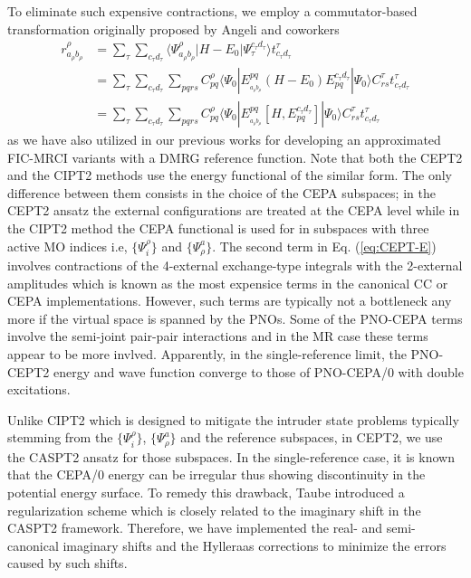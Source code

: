 \documentclass[aip,jcp,amsmath,twocolumn,floatfix,reprint,fleqn]{revtex4-1}
\begin{document}
%
To eliminate such expensive contractions, we employ a commutator-based transformation originally proposed by Angeli and coworkers\cite{angeliintroduction2001,angelin-electron2002,angelinew2006}
%
\begin{align}
  r_{a_\rho b_\rho}^{\rho} &= \sum_{\tau}\sum_{c_\tau d_\tau}\langle\Psi_{a_\rho b_\rho}^{\rho}|H-E_0|\Psi_{\tau}^{c_\tau d_\tau}\rangle t_{c_\tau d_\tau}^\tau \nonumber \\
  &= \sum_{\tau}\sum_{c_\tau d_\tau} \sum_{pqrs} C_{pq}^\rho \langle\Psi_0|E_{_{a_\rho b_\rho}}^{pq}(H-E_0)E_{pq}^{c_\tau d_\tau}|\Psi_0\rangle C_{rs}^\tau t_{c_\tau d_\tau}^\tau \nonumber \\
  &= \sum_{\tau}\sum_{c_\tau d_\tau} \sum_{pqrs} C_{pq}^\rho \langle\Psi_0|E_{_{a_\rho b_\rho}}^{pq}[H,E_{pq}^{c_\tau d_\tau}]|\Psi_0\rangle C_{rs}^\tau t_{c_\tau d_\tau}^\tau \label{eq:comm}
\end{align}
as we have also utilized in our previous works for developing an approximated FIC-MRCI variants with a DMRG reference function.\cite{saitowmultireference2013,doi:10.1021/acs.jctc.5b00270}
%
Note that both the CEPT2 and the CIPT2\cite{celanithe2004} methods use the energy functional of the similar form.
%
The only difference between them consists in the choice of the CEPA subspaces; in the CEPT2 ansatz the external configurations are treated at the CEPA level while in the CIPT2 method the CEPA functional is used for in subspaces with three active MO indices i.e, $\{\Psi_i^\rho\}$ and $\{\Psi_\rho^a\}$.
%
The second term in Eq. (\ref{eq:CEPT-E}) involves contractions of the 4-external exchange-type integrals with the 2-external amplitudes which is known as the most expensice terms in the canonical CC or CEPA implementations.
%
However, such terms are typically not a bottleneck any more if the virtual space is spanned by the PNOs.
%
Some of the PNO-CEPA terms involve the semi-joint pair-pair interactions and in the MR case these terms appear to be more invlved.
%
Apparently, in the single-reference limit, the PNO-CEPT2 energy and wave function converge to those of PNO-CEPA/0 with double excitations.

%
Unlike CIPT2 which is designed to mitigate the intruder state problems typically stemming from the $\{\Psi_i^\rho\}$, $\{\Psi_\rho^a\}$ and the reference subspaces, in CEPT2, we use the CASPT2 ansatz for those subspaces.
%
In the single-reference case, it is known that the CEPA/0 energy can be irregular thus showing discontinuity in the potential energy surface.
%
To remedy this drawback, Taube introduced a regularization scheme which is closely related to the imaginary shift in the CASPT2 framework.\cite{doi:10.1063/1.3115467}
%
Therefore, we have implemented the real- and semi-canonical imaginary shifts and the Hylleraas corrections to minimize the errors caused by such shifts.
\end{document}
